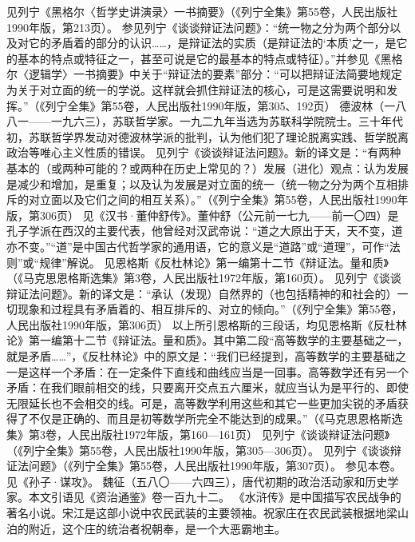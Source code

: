 \begin{maonote}
见列宁《黑格尔〈哲学史讲演录〉一书摘要》（《列宁全集》第55卷，人民出版社1990年版，第213页）。
参见列宁《谈谈辩证法问题》：“统一物之分为两个部分以及对它的矛盾着的部分的认识……，是辩证法的实质（是辩证法的‘本质’之一，是它的基本的特点或特征之一，甚至可说是它的最基本的特点或特征）。”并参见《黑格尔〈逻辑学〉一书摘要》中关于“辩证法的要素”部分：“可以把辩证法简要地规定为关于对立面的统一的学说。这样就会抓住辩证法的核心，可是这需要说明和发挥。”（《列宁全集》第55卷，人民出版社1990年版，第305、192页）
德波林（一八八一——一九六三），苏联哲学家。一九二九年当选为苏联科学院院士。三十年代初，苏联哲学界发动对德波林学派的批判，认为他们犯了理论脱离实践、哲学脱离政治等唯心主义性质的错误。
见列宁《谈谈辩证法问题》。新的译文是：“有两种基本的（或两种可能的？或两种在历史上常见的？）发展（进化）观点：认为发展是减少和增加，是重复；以及认为发展是对立面的统一（统一物之分为两个互相排斥的对立面以及它们之间的相互关系）。”（《列宁全集》第55卷，人民出版社1990年版，第306页）
见《汉书·董仲舒传》。董仲舒（公元前一七九——前一〇四）是孔子学派在西汉的主要代表，他曾经对汉武帝说：“道之大原出于天，天不变，道亦不变。”“道”是中国古代哲学家的通用语，它的意义是“道路”或“道理”，可作“法则”或“规律”解说。
见恩格斯《反杜林论》第一编第十二节《辩证法。量和质》（《马克思恩格斯选集》第3卷，人民出版社1972年版，第160页）。
见列宁《谈谈辩证法问题》。新的译文是：“承认（发现）自然界的（也包括精神的和社会的）一切现象和过程具有矛盾着的、相互排斥的、对立的倾向。”（《列宁全集》第55卷，人民出版社1990年版，第306页）
以上所引恩格斯的三段话，均见恩格斯《反杜林论》第一编第十二节《辩证法。量和质》。其中第二段“高等数学的主要基础之一，就是矛盾……”，《反杜林论》中的原文是：“我们已经提到，高等数学的主要基础之一是这样一个矛盾：在一定条件下直线和曲线应当是一回事。高等数学还有另一个矛盾：在我们眼前相交的线，只要离开交点五六厘米，就应当认为是平行的、即使无限延长也不会相交的线。可是，高等数学利用这些和其它一些更加尖锐的矛盾获得了不仅是正确的、而且是初等数学所完全不能达到的成果。”（《马克思恩格斯选集》第3卷，人民出版社1972年版，第160—161页）
见列宁《谈谈辩证法问题》（《列宁全集》第55卷，人民出版社1990年版，第305—306页）。
见列宁《谈谈辩证法问题》（《列宁全集》第55卷，人民出版社1990年版，第307页）。
参见本卷。
见《孙子·谋攻》。
魏征（五八〇——六四三），唐代初期的政治活动家和历史学家。本文引语见《资治通鉴》卷一百九十二。
《水浒传》是中国描写农民战争的著名小说。宋江是这部小说中农民武装的主要领袖。祝家庄在农民武装根据地梁山泊的附近，这个庄的统治者祝朝奉，是一个大恶霸地主。

\end{maonote}
